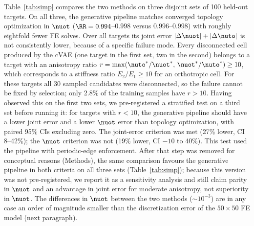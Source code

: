 Table~\ref{tab:simp} compares the two methods on three disjoint sets of 100
held-out targets. On all three, the generative pipeline matches converged
topology optimization in $\nuot$ ($\RR=0.994$--$0.998$ versus
$0.996$--$0.998$) with roughly eightfold fewer FE solves. Over all targets
its joint error $|\Delta\nuot|+|\Delta\nuto|$ is not consistently lower,
because of a specific failure mode. Every disconnected cell produced by the
cVAE (one target in the first set, two in the second) belongs to a target
with an anisotropy ratio $r=\max(\nuto^{*}/\nuot^{*},\,\nuot^{*}/\nuto^{*})\ge10$,
which corresponds to a stiffness ratio $E_2/E_1\ge10$ for an orthotropic
cell. For these targets all 30 sampled candidates were disconnected, so the
failure cannot be fixed by selection; only 2.8\% of the training samples
have $r>10$. Having observed this on the first two sets, we pre-registered a
stratified test on a third set before running it: for targets with
$r<10$, the generative pipeline should have a lower joint error and a lower
$\nuot$ error than topology optimization, with paired 95\% CIs excluding zero.
The joint-error criterion was met (27\% lower, CI 8--42\%); the $\nuot$
criterion was not (19\% lower, CI $-10$ to 40\%). This test used the
pipeline with periodic-edge enforcement. After that step was removed for
conceptual reasons (Methods), the same comparison favours the generative
pipeline in both criteria on all three sets (Table~\ref{tab:simp}); because
this version was not pre-registered, we report it as a sensitivity analysis
and still claim parity in $\nuot$ and an advantage in joint error for
moderate anisotropy, not superiority in $\nuot$. The differences in $\nuot$ between the two methods
($\sim\!10^{-3}$) are in any case an order of magnitude smaller than the
discretization error of the $50\times50$ FE model (next paragraph).

